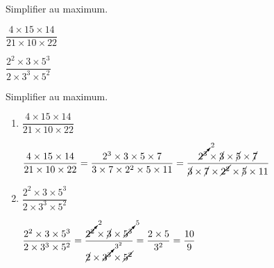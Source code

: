 \begin{exercice*}
    Simplifier au maximum.    
    \begin{enumerate}
        \begin{spacing}{2}
        \item $\dfrac{4\times 15\times 14}{21\times 10\times 22}$
        \item $\dfrac{2^2\times 3\times 5^3}{2\times 3^3\times 5^2}$
    \end{spacing}
    \end{enumerate}        
\end{exercice*}
\begin{corrige}
    Simplifier au maximum.

    \begin{enumerate}
        \item $\dfrac{4\times 15\times 14}{21\times 10\times 22}$
        
        \textcolor{red}{
            $\dfrac{4\times 15\times 14}{21\times 10\times 22}=\dfrac{2^3\times 3\times 5\times 7}{3\times 7\times 2^2\times 5\times 11}=\dfrac{\cancelto{2}{2^3}\times \cancel{3}\times \cancel{5}\times \cancel{7}}{\cancel{3}\times \cancel{7}\times \cancel{2^2}\times \cancel{5}\times 11}$
        }
        \item $\dfrac{2^2\times 3\times 5^3}{2\times 3^3\times 5^2}$
        
        \textcolor{red}{
            $\dfrac{2^2\times 3\times 5^3}{2\times 3^3\times 5^2} = \dfrac{\cancelto{2}{2^2}\times \cancel{3}\times \cancelto{5}{5^3}}{\cancel{2}\times \cancelto{3^2}{3^3}\times \cancel{5^2}} = \dfrac{2\times 5}{3^2} = \dfrac{10}{9}$
        }
    \end{enumerate}    

\end{corrige}

